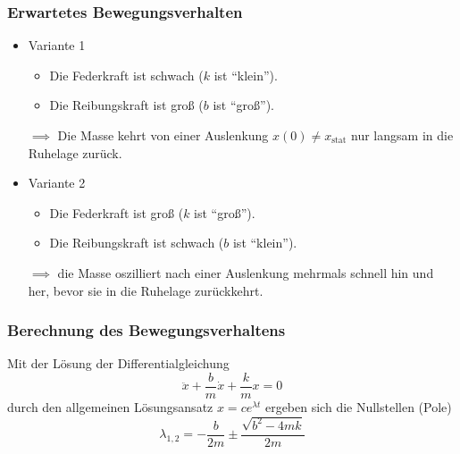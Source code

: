 			\subsubsection{Erwartetes Bewegungsverhalten} %
				\begin{itemize}
					\item Variante 1
						\begin{itemize}
							\item Die Federkraft ist schwach (\(k\) ist \enquote{klein}).
							\item Die Reibungskraft ist groß (\(b\) ist \enquote{groß}).
						\end{itemize}
						\(\implies\) Die Masse kehrt von einer Auslenkung \( x(0) \neq x _ \text{stat} \) nur langsam in die Ruhelage zurück.
					\item Variante 2
						\begin{itemize}
							\item Die Federkraft ist groß (\(k\) ist \enquote{groß}).
							\item Die Reibungskraft ist schwach (\(b\) ist \enquote{klein}).
						\end{itemize}
						\( \implies \) die Masse oszilliert nach einer Auslenkung mehrmals schnell hin und her, bevor sie in die Ruhelage zurückkehrt.
				\end{itemize}

			\subsubsection{Berechnung des Bewegungsverhaltens} %
				\label{sec:bewegung}

				Mit der Lösung der Differentialgleichung \[ \ddot{x} + \frac{b}{m} \dot{x} + \frac{k}{m} x = 0 \] durch den allgemeinen Lösungsansatz \( x = ce^{\lambda t} \) ergeben sich die Nullstellen (Pole) \[ \lambda _ { 1, 2 } = - \frac{b}{2m} \pm \frac{\sqrt{b^2 - 4mk}}{2m} \]

